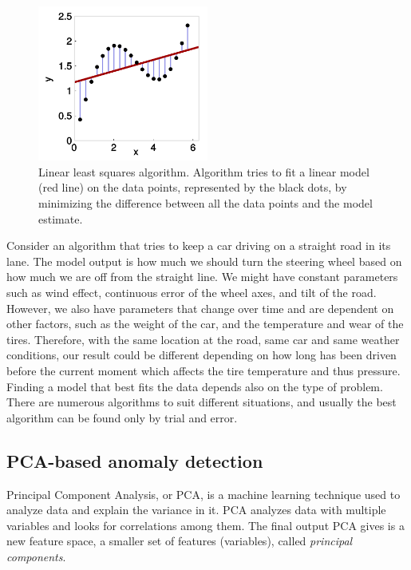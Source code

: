 \begin{figure}[htb]
    \centering
    \includegraphics[width=0.5\textwidth]{./appendices/linear-regression}
    \caption{Linear least squares algorithm.
    Algorithm tries to fit a linear model (red line) on the data points,
        represented by the black dots,
        by minimizing the difference between all the data points
        and the model estimate.~\cite{stulp2015many}
        \label{fig:linear-regression-example}}
\end{figure}

Consider an algorithm that tries to keep a car
driving on a straight road in its lane.
The model output is how much we should turn the steering wheel
based on how much we are off from the straight line.
We might have constant parameters such as
wind effect, continuous error of the wheel axes, and tilt of the road.
However,
we also have parameters that change over time
and are dependent on other factors,
such as the weight of the car,
and the temperature and wear of the tires.
Therefore, with the same location at the road,
same car and same weather conditions,
our result could be different
depending on how long has been driven before the current moment
which affects the tire temperature and thus pressure.
Finding a model that best fits the data
depends also on the type of problem.
There are numerous algorithms to suit different situations,
and usually the best algorithm can be found
only by trial and error.



\subsection{PCA-based anomaly detection}\label{subsec:bg-pca-ada}

Principal Component Analysis, or PCA,
is a machine learning technique
used to analyze data and explain the variance in it.
PCA analyzes data with multiple variables
and looks for correlations among them.
The final output PCA gives
is a new feature space,
\ie a smaller set of features (variables),
called \textit{principal components}.~\cite{azure2022pca}

